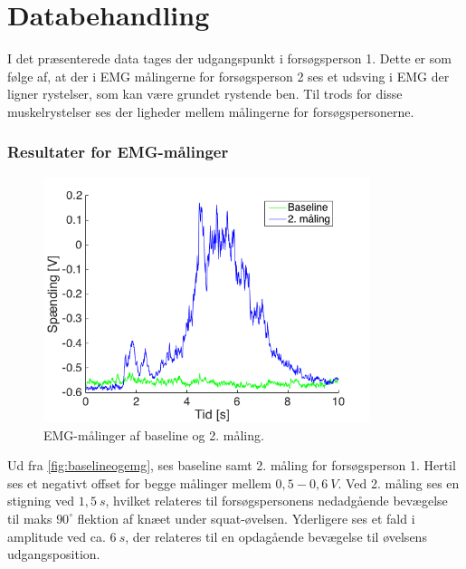 \section{Databehandling}
I det præsenterede data tages der udgangspunkt i forsøgsperson 1. Dette er som følge af, at der i EMG målingerne for forsøgsperson 2 ses et udsving i EMG der ligner rystelser, som kan være grundet rystende ben. Til trods for disse muskelrystelser ses der ligheder mellem målingerne for forsøgspersonerne. 

\subsubsection{Resultater for EMG-målinger}

\begin{figure}[H]
	\centering
	\includegraphics[width=0.85\textwidth]{figures/Pilotforsoeg/baselineogemg.png}
	\caption{EMG-målinger af baseline og 2. måling.}
	\label{fig:baselineogemg}
\end{figure}
Ud fra \autoref{fig:baselineogemg}, ses baseline samt 2. måling for forsøgsperson 1. Hertil ses et negativt offset for begge målinger mellem $0,5-0,6~V$. Ved 2. måling ses en stigning ved $1,5~s$, hvilket relateres til forsøgspersonens nedadgående bevægelse til maks $90^{\circ}$ flektion af knæet under squat-øvelsen. Yderligere ses et fald i amplitude ved ca. $6~s$, der relateres til en opdagående bevægelse til øvelsens udgangsposition. 


